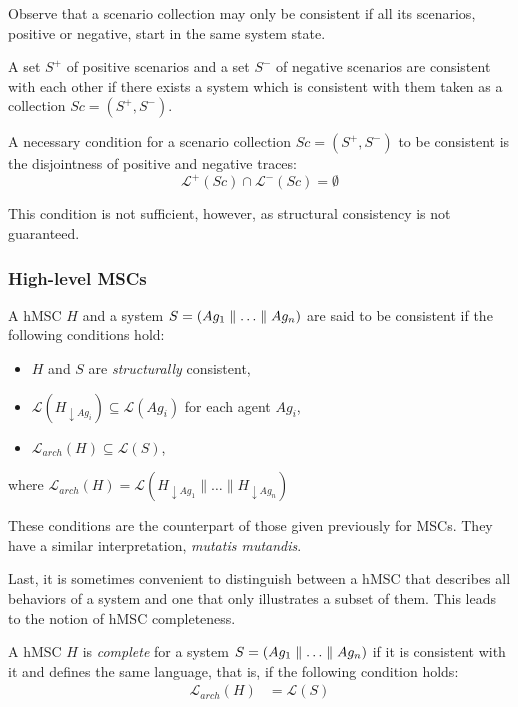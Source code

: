 Observe that a scenario collection may only be consistent if all its scenarios, positive or negative, start in the same system state.

A set $S^+$ of positive scenarios and a set $S^-$ of negative scenarios are consistent with each other if there exists a system which is consistent with them taken as a collection $Sc = (S^+,S^-)$. 

A necessary condition for a scenario collection $Sc = (S^+,S^-)$ to be consistent is the disjointness of positive and negative traces:
\begin{equation}
\mathcal{L}^+(Sc) \cap \mathcal{L}^-(Sc) = \emptyset
\end{equation}

This condition is not sufficient, however, as structural consistency is not guaranteed.

\subsubsection*{High-level MSCs}

A hMSC $H$ and a system $S = (Ag_1 \parallel \ldots \parallel Ag_n)$ are said to be consistent if the following conditions hold:
\begin{itemize}
\item $H$ and $S$ are \emph{structurally} consistent,
\item $\mathcal{L}(H_{\downarrow Ag_i}) \subseteq \mathcal{L}(Ag_i)$ for each agent $Ag_i$,
\item $\mathcal{L}_{arch}(H) \subseteq \mathcal{L}(S)$,
\end{itemize}
where $\mathcal{L}_{arch}(H) = \mathcal{L}(H_{\downarrow Ag_1} \parallel \ldots \parallel H_{\downarrow Ag_n})$

These conditions are the counterpart of those given previously for MSCs. They have a similar interpretation, \emph{mutatis mutandis}. 

Last, it is sometimes convenient to distinguish between a hMSC that describes all behaviors of a system and one that only illustrates a subset of them. This leads to the notion of hMSC completeness. 

A hMSC $H$ is \emph{complete} for a system $S = (Ag_1 \parallel \ldots \parallel Ag_n)$ if it is consistent with it and defines the same language, that is, if the following condition holds:
\begin{align}
\mathcal{L}_{arch}(H) &= \mathcal{L}(S)
\end{align}

